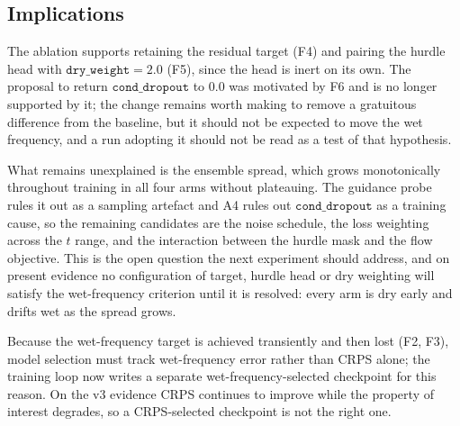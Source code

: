 \subsection{Implications}

The ablation supports retaining the residual target (F4) and pairing the hurdle
head with $\texttt{dry\_weight}=2.0$ (F5), since the head is inert on its own.
The proposal to return $\texttt{cond\_dropout}$ to $0.0$ was motivated by F6 and
is no longer supported by it; the change remains worth making to remove a
gratuitous difference from the baseline, but it should not be expected to move
the wet frequency, and a run adopting it should not be read as a test of that
hypothesis.

What remains unexplained is the ensemble spread, which grows monotonically
throughout training in all four arms without plateauing. The guidance probe
rules it out as a sampling artefact and A4 rules out $\texttt{cond\_dropout}$ as
a training cause, so the remaining candidates are the noise schedule, the loss
weighting across the $t$ range, and the interaction between the hurdle mask and
the flow objective. This is the open question the next experiment should
address, and on present evidence no configuration of target, hurdle head or dry
weighting will satisfy the wet-frequency criterion until it is resolved: every
arm is dry early and drifts wet as the spread grows.

Because the wet-frequency target is achieved transiently and then lost (F2, F3),
model selection must track wet-frequency error rather than CRPS alone; the
training loop now writes a separate wet-frequency-selected checkpoint for this
reason. On the v3 evidence CRPS continues to improve while the property of
interest degrades, so a CRPS-selected checkpoint is not the right one.
